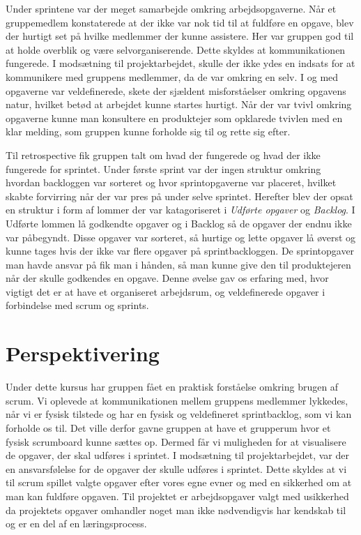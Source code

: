 Under sprintene var der meget samarbejde omkring arbejdsopgaverne. Når et gruppemedlem konstaterede at der ikke var nok tid til at fuldføre en opgave, blev der hurtigt set på hvilke medlemmer der kunne assistere. Her var gruppen god til at holde overblik og være selvorganiserende. Dette skyldes at kommunikationen fungerede. I modsætning til projektarbejdet, skulle der ikke ydes en indsats for at kommunikere med gruppens medlemmer, da de var omkring en selv. 
I og med opgaverne var veldefinerede, skete der sjældent misforståelser omkring opgavens natur, hvilket betød at arbejdet kunne startes hurtigt. Når der var tvivl omkring opgaverne kunne man konsultere en produktejer som opklarede tvivlen med en klar melding, som gruppen kunne forholde sig til og rette sig efter.  \newline

Til retrospective fik gruppen talt om hvad der fungerede og hvad der ikke fungerede for sprintet. Under første sprint var der ingen struktur omkring hvordan backloggen var sorteret og hvor sprintopgaverne var placeret, hvilket skabte forvirring når der var pres på under selve sprintet. Herefter blev der opsat en struktur i form af lommer der var katagoriseret i \textit{Udførte opgaver} og \textit{Backlog}. I Udførte lommen lå godkendte opgaver og i Backlog så de opgaver der endnu ikke var påbegyndt. Disse opgaver var sorteret, så hurtige og lette opgaver lå øverst og kunne tages hvis der ikke var flere opgaver på sprintbackloggen. De sprintopgaver man havde ansvar på fik man i hånden, så man kunne give den til produktejeren når der skulle godkendes en opgave. \newline
Denne øvelse gav os erfaring med, hvor vigtigt det er at have et organiseret arbejdsrum, og veldefinerede opgaver i forbindelse med scrum og sprints.

\section{Perspektivering}
Under dette kursus har gruppen fået en praktisk forståelse omkring brugen af scrum. Vi oplevede at kommunikationen mellem gruppens medlemmer lykkedes, når vi er fysisk tilstede og har en fysisk og veldefineret sprintbacklog, som vi kan forholde os til. Det ville derfor gavne gruppen at have et grupperum hvor et fysisk scrumboard kunne sættes op. Dermed får vi muligheden for at visualisere de opgaver, der skal udføres i sprintet. \newline
I modsætning til projektarbejdet, var der en ansvarsfølelse for de opgaver der skulle udføres i sprintet. Dette skyldes at vi til scrum spillet valgte opgaver efter vores egne evner og med en sikkerhed om at man kan fuldføre opgaven. Til projektet er arbejdsopgaver valgt med usikkerhed da projektets opgaver omhandler noget man ikke nødvendigvis har kendskab til og er en del af en læringsprocess.

